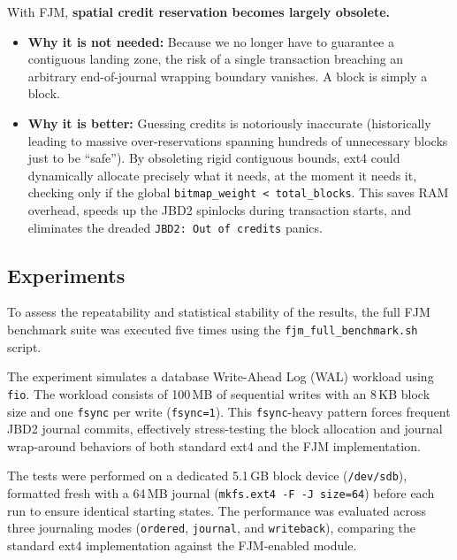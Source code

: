 \documentclass[12pt,a4paper]{article}
\begin{document}
With FJM, \textbf{spatial credit reservation becomes largely
obsolete.}

\begin{itemize}[leftmargin=*]
    \item \textbf{Why it is not needed:} Because we no longer
          have to guarantee a contiguous landing zone, the risk
          of a single transaction breaching an arbitrary
          end-of-journal wrapping boundary vanishes. A block is
          simply a block.
    \item \textbf{Why it is better:} Guessing credits is
          notoriously inaccurate (historically leading to massive
          over-reservations spanning hundreds of unnecessary
          blocks just to be ``safe''). By obsoleting rigid
          contiguous bounds, ext4 could dynamically allocate
          precisely what it needs, at the moment it needs it,
          checking only if the global \texttt{bitmap\_weight <
          total\_blocks}. This saves RAM overhead, speeds up the
          JBD2 spinlocks during transaction starts, and
          eliminates the dreaded \texttt{JBD2: Out of credits}
          panics.
\end{itemize}

\subsection{Experiments}

To assess the repeatability and statistical stability of the
results, the full FJM benchmark suite was executed five times
using the \texttt{fjm\_full\_benchmark.sh} script.

The experiment simulates a database Write-Ahead Log (WAL)
workload using \texttt{fio}. The workload consists of 100\,MB of
sequential writes with an 8\,KB block size and one \texttt{fsync}
per write (\texttt{fsync=1}). This \texttt{fsync}-heavy pattern
forces frequent JBD2 journal commits, effectively stress-testing
the block allocation and journal wrap-around behaviors of both
standard ext4 and the FJM implementation.

The tests were performed on a dedicated 5.1\,GB block device
(\texttt{/dev/sdb}), formatted fresh with a 64\,MB journal
(\texttt{mkfs.ext4 -F -J size=64}) before each run to ensure
identical starting states. The performance was evaluated across
three journaling modes (\texttt{ordered}, \texttt{journal}, and
\texttt{writeback}), comparing the standard ext4 implementation
against the FJM-enabled module.
\end{document}
